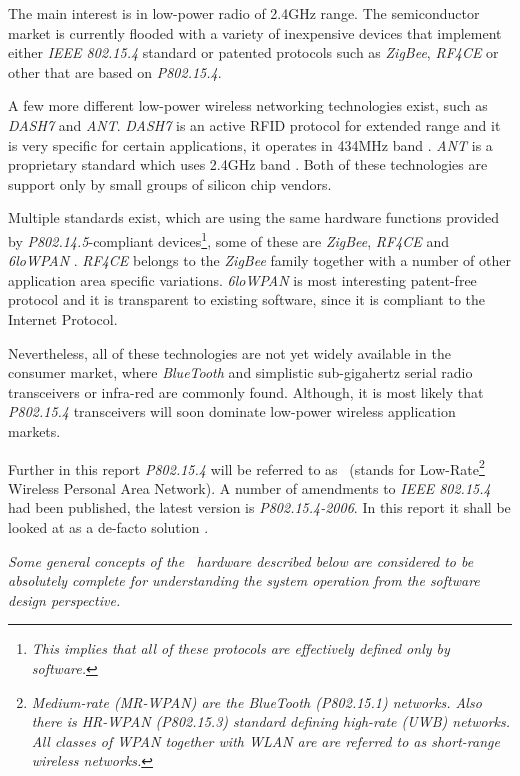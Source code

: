   The main interest is in low-power radio of 2.4GHz range. The semiconductor
 market is currently flooded with a variety of inexpensive devices that
 implement either \emph{IEEE 802.15.4} standard or patented protocols such
 as \emph{ZigBee}, \emph{RF4CE} or other that are based on \emph{P802.15.4}.

 A few more different low-power wireless networking technologies exist, such
 as \emph{DASH7} and \emph{ANT}. \emph{DASH7} is an active RFID protocol for
 extended range and it is very specific for certain applications, it operates
 in 434MHz band \cite{links:wiki:p:dash7}. \emph{ANT} is a proprietary standard
 which uses 2.4GHz band \cite{links:wiki:p:ant}. Both of these technologies
 are support only by small groups of silicon chip vendors.

 Multiple standards exist, which are using the same hardware functions provided
 by \emph{P802.14.5}-compliant devices\footnote{\emph{This implies that all of
 these protocols are effectively defined only by software.}}, some of these are
 \emph{ZigBee}, \emph{RF4CE} and \emph{6loWPAN} \cite{links:wiki:p:6lowpan}.
 \emph{RF4CE} belongs to the \emph{ZigBee} \cite{links:wiki:p:zigbee} family
 together with a number of other application area specific variations.
 \emph{6loWPAN} \cite{links:wiki:p:6lowpan} is most interesting patent-free
 protocol and it is transparent to existing software, since it is compliant
 to the Internet Protocol. %

  Nevertheless, all of these technologies are not yet widely available in
 the consumer market, where \emph{BlueTooth} \cite{links:wiki:p:mrwpan} and
 simplistic sub-gigahertz serial radio transceivers or infra-red are commonly
 found. Although, it is most likely that \emph{P802.15.4} transceivers will
 soon dominate low-power wireless application markets.

 Further in this report \emph{P802.15.4} will be referred to as \WPAN\ 
 (stands for Low-Rate\footnote{\emph{Medium-rate (MR-WPAN) are the BlueTooth
 (P802.15.1) networks. Also there is HR-WPAN (P802.15.3) standard defining
 high-rate (UWB) networks. All classes of WPAN together with WLAN are
 are referred to as short-range wireless networks.}} Wireless Personal
 Area Network). A number of amendments to \emph{IEEE 802.15.4} had been
 published, the latest version is \emph{P802.15.4-2006}. In this report
 it shall be looked at as a de-facto solution \cite{links:wiki:p:wpan,
 links:wiki:p:lrwpan, links:ieee:802:15}.

 \emph{Some general concepts of the \WPAN\ hardware described below
 are considered to be absolutely complete for understanding the
 system operation from the software design perspective.}

